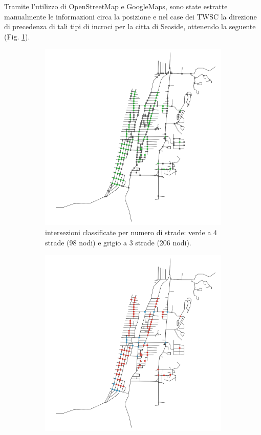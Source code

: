Tramite l'utilizzo di OpenStreetMap e GoogleMaps, sono state estratte manualmente le informazioni circa la posizione e nel case dei TWSC la direzione
di precedenza di tali tipi di incroci per la citta di Seaside, ottenendo la seguente (Fig. \ref{fig:intersections}).

\begin{figure}
    \centering
    \begin{subfigure}{0.475\textwidth}
        \includegraphics[width=\textwidth]{images/intersections}
        \caption{intersezioni classificate per numero di strade: verde a 4 strade (98 nodi) e grigio a 3 strade (206 nodi).}
        \label{fig:intersections}
    \end{subfigure}
    \hfill
    \begin{subfigure}{0.475\textwidth}
        \includegraphics[width=\textwidth]{images/int_type}

\end{subfigure}
\end{figure}
